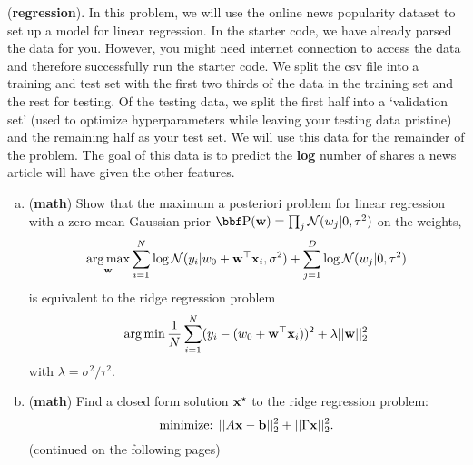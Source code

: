 \documentclass[12pt,letterpaper]{hmcpset}
\begin{document}
\begin{problem}[4]
(\textbf{regression}). In this problem, we will use the online news popularity dataset to set up a model for linear regression. In the starter code, we have already parsed the data for you. However, you might need internet connection to access the data and therefore successfully run the starter code.
\newline \newline
We split the csv file into a training and test set with
the first two thirds of the data in the training set and the rest for testing.
Of the testing data, we split the first half into a `validation set' (used
to optimize hyperparameters while leaving your testing data pristine) and
the remaining half as your test set.
We will use this data for the remainder of the problem. The goal of this data
is to predict the \textbf{log} number of shares a news article will have given the other
features.
\newline \newline
\begin{enumerate}[(a)]
	\item (\textbf{math}) Show that the maximum a posteriori problem for
	linear regression with a zero-mean Gaussian prior $\PP(\ww) = \prod_j
	\Nc(w_j | 0, \tau^2)$ on the weights,
	\[
	\operatorname*{arg\,max}_{\bf w} \sum_{i=1}^N \log{\cal N}(y_i | w_0 + {\bf w}^\top{\bf x}_i, \sigma^2) + \sum_{j=1}^D \log{\cal N}(w_j | 0, \tau^2)
	\]
	is equivalent to the ridge regression problem
	\[
	\operatorname*{arg\,min} \frac{1}{N}\sum_{i=1}^N (y_i - (w_0 + {\bf w}^\top{\bf x}_i))^2 + \lambda ||{\bf w}||_2^2
	\]
	with $\lambda = \sigma^2 / \tau^2$.
	\item (\textbf{math}) Find a closed form solution ${\bf x}^\star$ to the ridge regression
	problem:
	\[
	\text{minimize: } ||A{\bf x} - {\bf b}||_2^2 + ||\Gamma{\bf x}||_2^2.
	\]
	(continued on the following pages)
\end{enumerate}
\end{problem}
\begin{solution}
	\vfill
\end{solution}
\newpage
\end{document}
